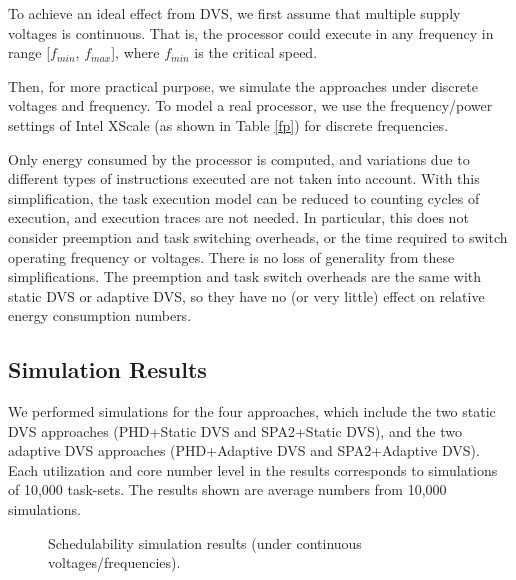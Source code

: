 \documentclass[12pt, journal,compsoc]{IEEEtran}
\begin{document}
To achieve an ideal effect from DVS, we first assume that multiple supply voltages is continuous. That is, the processor could execute in any frequency in range [$f_{min}$, $f_{max}$], where $f_{min}$ is the critical speed.

Then, for more practical purpose, we simulate the approaches under discrete voltages and frequency. To model a real processor, we use the frequency/power settings of Intel XScale \cite{Xu:2004:PPE:1017753.1017767}(as shown in Table \ref{fp}) for discrete frequencies.

Only energy consumed by the processor is computed, and variations due to different types of instructions executed are not taken into account. With this simplification, the task execution model can be reduced to counting cycles of execution, and execution traces are not needed. In particular, this does not consider preemption and task switching overheads, or the time required to switch operating frequency or voltages. There is no loss of generality from these simplifications. The preemption and task switch overheads are the same with static DVS or adaptive DVS, so they have no (or very little) effect on relative energy consumption numbers.



\subsection{Simulation Results}

We performed simulations for the four approaches, which
include the two static DVS approaches (PHD+Static DVS and SPA2+Static DVS),
and the two adaptive DVS approaches (PHD+Adaptive DVS and SPA2+Adaptive DVS).
Each utilization and core number level in the
results corresponds to simulations of 10,000 task-sets.
The results shown are average numbers from 10,000 simulations.

\begin{figure*}[!t]
\centering
{}
\hspace{-0.2in}
\hspace{-0.2in}
\hspace{-0.2in}
\caption{Schedulability simulation results (under continuous voltages/frequencies).}
\label{s}
\end{figure*}
\end{document}
